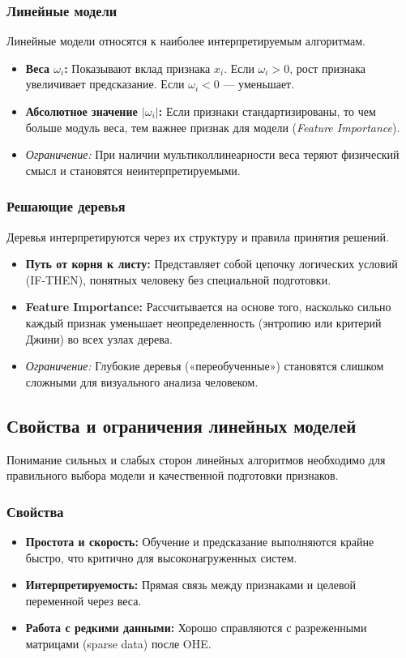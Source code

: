 \documentclass[12pt]{article}
\begin{document}
\subsubsection{Линейные модели}
Линейные модели относятся к наиболее интерпретируемым алгоритмам.
\begin{itemize}
    \item \textbf{Веса $\omega_i$:} Показывают вклад признака $x_i$. Если $\omega_i > 0$, рост признака увеличивает предсказание. Если $\omega_i < 0$ — уменьшает.
    \item \textbf{Абсолютное значение $|\omega_i|$:} Если признаки стандартизированы, то чем больше модуль веса, тем важнее признак для модели (\textit{Feature Importance}).
    \item \textit{Ограничение:} При наличии мультиколлинеарности веса теряют физический смысл и становятся неинтерпретируемыми.
\end{itemize}

\subsubsection{Решающие деревья}
Деревья интерпретируются через их структуру и правила принятия решений.
\begin{itemize}
    \item \textbf{Путь от корня к листу:} Представляет собой цепочку логических условий (IF-THEN), понятных человеку без специальной подготовки.
    \item \textbf{Feature Importance:} Рассчитывается на основе того, насколько сильно каждый признак уменьшает неопределенность (энтропию или критерий Джини) во всех узлах дерева.
    \item \textit{Ограничение:} Глубокие деревья («переобученные») становятся слишком сложными для визуального анализа человеком.
\end{itemize}

\subsection{Свойства и ограничения линейных моделей}
Понимание сильных и слабых сторон линейных алгоритмов необходимо для правильного выбора модели и качественной подготовки признаков.

\subsubsection{Свойства}
\begin{itemize}
    \item \textbf{Простота и скорость:} Обучение и предсказание выполняются крайне быстро, что критично для высоконагруженных систем.
    \item \textbf{Интерпретируемость:} Прямая связь между признаками и целевой переменной через веса.
    \item \textbf{Работа с редкими данными:} Хорошо справляются с разреженными матрицами (sparse data) после OHE.
\end{itemize}
\end{document}
